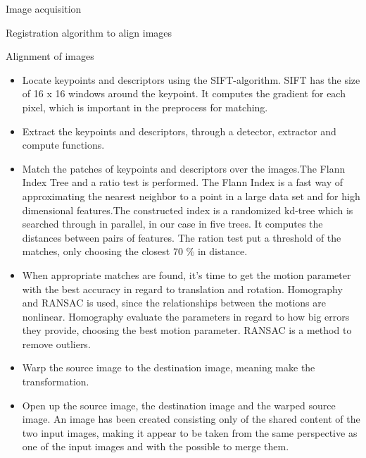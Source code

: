 \documentclass[10pt]{article}
\begin{document}
\begin{section}{Image acquisition}
\begin{subsection}{Registration algorithm to align images}
\begin{subsubsection}{Alignment of images}
\begin{itemize}
                \item Locate keypoints and descriptors using the SIFT-algorithm. SIFT has the size of 16 x 16 windows around the keypoint. It computes the gradient for each pixel, which is important in the preprocess for matching.

                \item Extract the keypoints and descriptors, through a detector, extractor and compute functions.

                \item Match the patches of keypoints and descriptors over the images.The Flann Index Tree and a ratio test is performed. The Flann Index is a fast way of approximating the nearest neighbor to a point in a large data set and for high dimensional features.The constructed index is a randomized kd-tree which is searched through in parallel, in our case in five trees. It computes the distances between pairs of features. The ration test put a threshold of the matches, only choosing the closest 70 \% in distance.

                \item When appropriate matches are found, it’s time to get the motion parameter with the best accuracy in regard to translation and rotation. Homography and RANSAC is used, since the relationships between the motions are nonlinear. Homography evaluate the parameters in regard to how big errors they provide, choosing the best motion parameter. RANSAC is a method to remove outliers.

                \item Warp the source image to the destination image, meaning make the transformation.

                \item Open up the source image, the destination image and the warped source image. An image has been created consisting only of the shared content of the two input images, making it appear to be taken from the same perspective as one of the input images and with the possible to merge them.

            \end{itemize}
        \end{subsubsection} %

    \end{subsection} %
\end{section}
\end{document}
